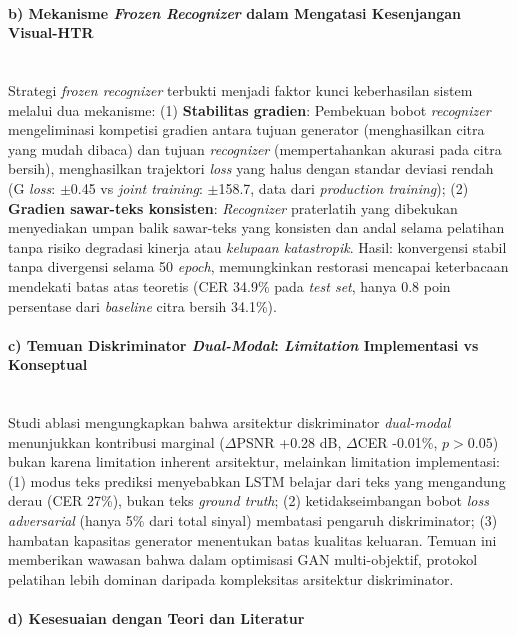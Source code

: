 \documentclass[12pt,a4paper]{article}
\begin{document}
\paragraph{b) Mekanisme \textit{Frozen Recognizer} dalam Mengatasi Kesenjangan Visual-HTR}\mbox{}\\[0.1em]

Strategi \textit{frozen recognizer} terbukti menjadi faktor kunci keberhasilan sistem melalui dua mekanisme: (1) \textbf{Stabilitas gradien}: Pembekuan bobot \textit{recognizer} mengeliminasi kompetisi gradien antara tujuan generator (menghasilkan citra yang mudah dibaca) dan tujuan \textit{recognizer} (mempertahankan akurasi pada citra bersih), menghasilkan trajektori \textit{loss} yang halus dengan standar deviasi rendah (G \textit{loss}: $\pm$0.45 vs \textit{joint training}: $\pm$158.7, data dari \textit{production training}); (2) \textbf{Gradien sawar-teks konsisten}: \textit{Recognizer} praterlatih yang dibekukan menyediakan umpan balik sawar-teks yang konsisten dan andal selama pelatihan tanpa risiko degradasi kinerja atau \textit{kelupaan katastropik}. Hasil: konvergensi stabil tanpa divergensi selama 50 \textit{epoch}, memungkinkan restorasi mencapai keterbacaan mendekati batas atas teoretis (CER 34.9\% pada \textit{test set}, hanya 0.8 poin persentase dari \textit{baseline} citra bersih 34.1\%).

\paragraph{c) Temuan Diskriminator \textit{Dual-Modal}: \textit{Limitation} Implementasi vs Konseptual}\mbox{}\\[0.1em]

Studi ablasi mengungkapkan bahwa arsitektur diskriminator \textit{dual-modal} menunjukkan kontribusi marginal ($\Delta$PSNR +0.28 dB, $\Delta$CER -0.01\%, $p>0.05$) bukan karena limitation inherent arsitektur, melainkan limitation implementasi: (1) modus teks prediksi menyebabkan LSTM belajar dari teks yang mengandung derau (CER 27\%), bukan teks \textit{ground truth}; (2) ketidakseimbangan bobot \textit{loss adversarial} (hanya 5\% dari total sinyal) membatasi pengaruh diskriminator; (3) hambatan kapasitas generator menentukan batas kualitas keluaran. Temuan ini memberikan wawasan bahwa dalam optimisasi GAN multi-objektif, protokol pelatihan lebih dominan daripada kompleksitas arsitektur diskriminator.

\paragraph{d) Kesesuaian dengan Teori dan Literatur}\mbox{}\\[0.1em]
\end{document}
